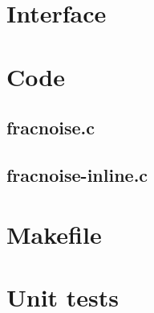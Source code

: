 \section{Interface}

\begin{scriptsize}
\begin{ttfamily}

\end{ttfamily}
\end{scriptsize}

\section{Code}

\subsection{fracnoise.c}

\begin{scriptsize}
\begin{ttfamily}

\end{ttfamily}
\end{scriptsize}

\subsection{fracnoise-inline.c}

\begin{scriptsize}
\begin{ttfamily}

\end{ttfamily}
\end{scriptsize}

\section{Makefile}

\begin{scriptsize}
\begin{ttfamily}

\end{ttfamily}
\end{scriptsize}

\section{Unit tests}

